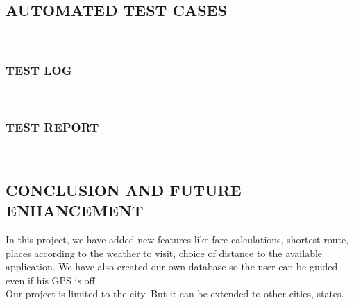 \documentclass[12pt,a4paper]{article}
\begin{document}
\begin{center}
\subsection{AUTOMATED TEST CASES}
\\
\subsubsection{TEST LOG}
\\
\newpage
\subsubsection{TEST REPORT}
\\


\newpage
\pagestyle{plain} 
\begin{center}
\section{CONCLUSION AND FUTURE ENHANCEMENT}
\end{center}
\hspace{0.7 cm} In this project, we have added new features like fare calculations, shortest route, places according to the weather to visit, choice of distance to the available application. We have also created our own database so the user can be guided even if his GPS is off.
\\
\hspace{0.7 cm} Our project is limited to the city. But it can be extended to other cities, states. 
\\


\newpage
\pagestyle{plain}
\begin{center}

\end{center}
\end{center}
\end{document}
